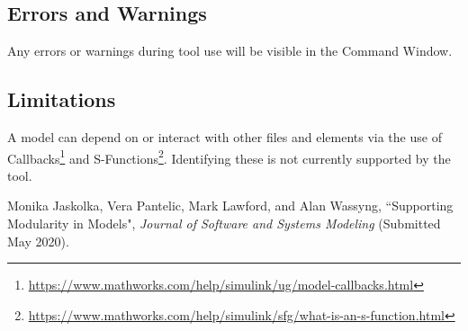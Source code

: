 \documentclass{article}
\begin{document}

\subsection{Errors and Warnings}
Any errors or warnings during tool use will be visible in the \matlab Command Window.

\subsection{Limitations}
A \Simulink model can depend on or interact with other files and elements via the use of Callbacks\footnote{\url{https://www.mathworks.com/help/simulink/ug/model-callbacks.html}} and S-Functions\footnote{\url{https://www.mathworks.com/help/simulink/sfg/what-is-an-s-function.html}}. Identifying these is not currently supported by the tool.

\begin{thebibliography}{9}
Monika Jaskolka, Vera Pantelic, Mark Lawford, and Alan Wassyng, ``Supporting Modularity in \Simulink Models", \emph{Journal of Software and Systems Modeling} (Submitted May 2020).
\end{thebibliography}
\end{document}
